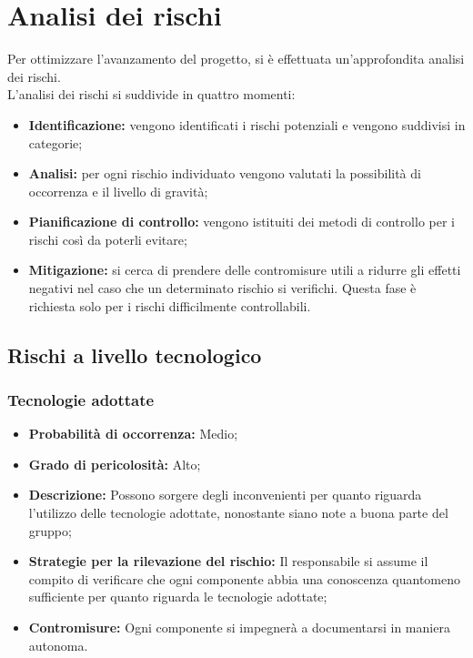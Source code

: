 \section{Analisi dei rischi}
Per ottimizzare l'avanzamento del progetto, si è effettuata un'approfondita analisi dei
rischi. \\
L'analisi dei rischi si suddivide in quattro momenti: \\
\begin{itemize}
	\item \textbf{Identificazione:} vengono identificati i rischi potenziali e vengono suddivisi in categorie;
	\item \textbf{Analisi:} per ogni rischio individuato vengono valutati la possibilità di occorrenza e il livello di gravità;
	\item \textbf{Pianificazione di controllo:} vengono istituiti dei metodi di controllo per i rischi così da poterli evitare;
	\item \textbf{Mitigazione:} si cerca di prendere delle contromisure utili a ridurre gli effetti negativi nel caso che un determinato rischio si verifichi. Questa fase è richiesta solo per i rischi difficilmente controllabili. \\
\end{itemize}
	\subsection{Rischi a livello tecnologico}
		\subsubsection{Tecnologie adottate}
		\begin{itemize}
			\item \textbf{Probabilità di occorrenza:} Medio; \\
			\item \textbf{Grado di pericolosità:} Alto; \\
			\item \textbf{Descrizione:} Possono sorgere degli inconvenienti per quanto riguarda l'utilizzo delle tecnologie adottate, nonostante siano note a buona parte del gruppo; \\
			\item \textbf{Strategie per la rilevazione del rischio:} Il responsabile si assume il compito di verificare che ogni componente abbia una conoscenza quantomeno sufficiente per quanto riguarda le tecnologie adottate; \\
			\item \textbf{Contromisure:} Ogni componente si impegnerà a documentarsi in maniera autonoma. \\
		\end{itemize}
